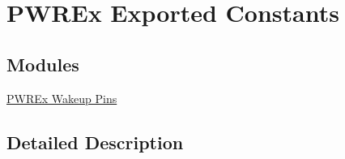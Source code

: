 \hypertarget{group___p_w_r_ex___exported___constants}{\section{P\-W\-R\-Ex Exported Constants}
\label{group___p_w_r_ex___exported___constants}
}
\subsection*{Modules}
\begin{DoxyCompactItemize}
\item 
\hyperlink{group___p_w_r_ex___wake_up___pins}{P\-W\-R\-Ex Wakeup Pins}
\end{DoxyCompactItemize}


\subsection{Detailed Description}

